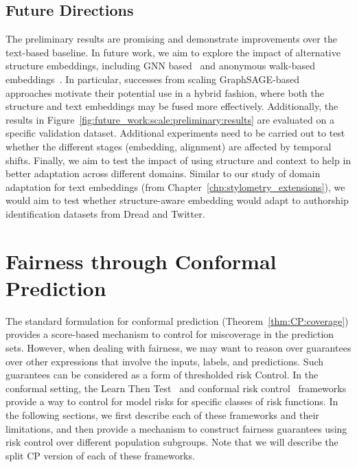 \subsection{Future Directions}
The preliminary results are promising and demonstrate improvements over the text-based baseline.
In future work, we aim to explore the impact of alternative structure embeddings, including GNN based~\cite{velivckovic2018graph,hamilton2017inductive} and anonymous walk-based embeddings~\citep{ivanov2018anonymous,wang2020inductive}.
In particular, successes from scaling GraphSAGE-based~\cite{hamilton2017inductive,ying2018graph} approaches motivate their potential use in a hybrid fashion, where both the structure and text embeddings may be fused more effectively.
Additionally, the results in Figure~\ref{fig:future_work:scale:preliminary:results} are evaluated on a specific validation dataset.
Additional experiments need to be carried out to test whether the different stages (embedding, alignment) are affected by temporal shifts.
Finally, we aim to test the impact of using structure and context to help in better adaptation across different domains.
Similar to our study of domain adaptation for text embeddings (from Chapter~\ref{chp:stylometry_extensions}), we would aim to test whether structure-aware embedding would adapt to authorship identification datasets from Dread and Twitter.

\section{Fairness through Conformal Prediction}
The standard formulation for conformal prediction (Theorem~\ref{thm:CP:coverage}) provides a score-based mechanism to control for miscoverage in the prediction sets.
However, when dealing with fairness, we may want to reason over guarantees over other expressions that involve the inputs, labels, and predictions.
Such guarantees can be considered as a form of thresholded risk Control.
In the conformal setting, the Learn Then Test~\citep{angelopoulos2021learn} and conformal risk control~\citep{angelopoulos2024conformal} frameworks provide a way to control for model risks for specific classes of risk functions.
In the following sections, we first describe each of these frameworks and their limitations, and then provide a mechanism to construct fairness guarantees using risk control over different population subgroups.
Note that we will describe the split CP version of each of these frameworks.

